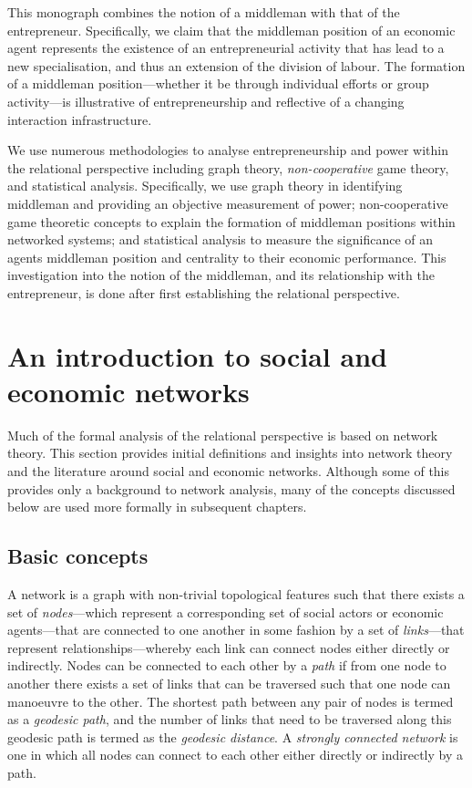 This monograph combines the notion of a middleman with that of the entrepreneur. Specifically, we claim that the middleman position of an economic agent represents the existence of an entrepreneurial activity that has lead to a new specialisation, and thus an extension of the division of labour. The formation of a middleman position---whether it be through individual efforts or group activity---is illustrative of entrepreneurship and reflective of a changing interaction infrastructure.

We use numerous methodologies to analyse entrepreneurship and power within the relational perspective including graph theory, \emph{non-cooperative} game theory, and statistical analysis. Specifically, we use graph theory in identifying middleman and providing an objective measurement of power; non-cooperative game theoretic concepts to explain the formation of middleman positions within networked systems; and statistical analysis to measure the significance of an agents middleman position and centrality to their economic performance. This investigation into the notion of the middleman, and its relationship with the entrepreneur, is done after first establishing the relational perspective.

\section{An introduction to social and economic networks}
\label{sec:socialeconomicnetworks}

Much of the formal analysis of the relational perspective is based on network theory. This section provides initial definitions and insights into network theory and the literature around social and economic networks. Although some of this provides only a background to network analysis, many of the concepts discussed below are used more formally in subsequent chapters.

\subsection{Basic concepts}

A network is a graph with non-trivial topological features such that there exists a set of \emph{nodes}---which represent a corresponding set of social actors or economic agents---that are connected to one another in some fashion by a set of \emph{links}---that represent relationships---whereby each link can connect nodes either directly or indirectly. Nodes can be connected to each other by a \emph{path} if from one node to another there exists a set of links that can be traversed such that one node can manoeuvre to the other. The shortest path between any pair of nodes is termed as a \emph{geodesic path}, and the number of links that need to be traversed along this geodesic path is termed as the \emph{geodesic distance}. A \emph{strongly connected network} is one in which all nodes can connect to each other either directly or indirectly by a path.

